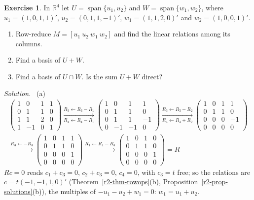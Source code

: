 \documentclass[12pt]{article}
\newcommand{\R}{\mathbb R}
\DeclareMathOperator{\Span}{span}
\theoremstyle{definition}
\newtheorem{exercise}{Exercise}
\newenvironment{solution}{\par\noindent\textit{Solution.}\ }{\par\smallskip}
\begin{document}
\begin{exercise}\label{r3-dr-sum-intersection}
In \(\R^4\) let \(U=\Span\{u_1,u_2\}\) and \(W=\Span\{w_1,w_2\}\), where \(u_1=(1,0,1,1)'\),
\(u_2=(0,1,1,-1)'\), \(w_1=(1,1,2,0)'\) and \(w_2=(1,0,0,1)'\).
\begin{enumerate}
\item Row-reduce \(M=[u_1\ u_2\ w_1\ w_2]\) and find the linear relations among its columns.
\item Find a basis of \(U+W\).
\item Find a basis of \(U\cap W\). Is the sum \(U+W\) direct?
\end{enumerate}
\end{exercise}
\begin{solution}
(a)
\[
\begin{gathered}
\begin{pmatrix}1&0&1&1\\0&1&1&0\\1&1&2&0\\1&-1&0&1\end{pmatrix}
\xrightarrow[R_4\leftarrow R_4-R_1]{R_3\leftarrow R_3-R_1}
\begin{pmatrix}1&0&1&1\\0&1&1&0\\0&1&1&-1\\0&-1&-1&0\end{pmatrix}
\xrightarrow[R_4\leftarrow R_4+R_2]{R_3\leftarrow R_3-R_2}
\begin{pmatrix}1&0&1&1\\0&1&1&0\\0&0&0&-1\\0&0&0&0\end{pmatrix}
\\
\xrightarrow{R_3\leftarrow-R_3}
\begin{pmatrix}1&0&1&1\\0&1&1&0\\0&0&0&1\\0&0&0&0\end{pmatrix}
\xrightarrow{R_1\leftarrow R_1-R_3}
\begin{pmatrix}1&0&1&0\\0&1&1&0\\0&0&0&1\\0&0&0&0\end{pmatrix}=R
\end{gathered}
\]
\(Rc=0\) reads \(c_1+c_3=0\), \(c_2+c_3=0\), \(c_4=0\), with \(c_3=t\) free; so the relations are
\(c=t(-1,-1,1,0)'\) (Theorem~\ref{r2-thm-rowops}(b), Proposition~\ref{r2-prop-solutions}(b)), the
multiples of \(-u_1-u_2+w_1=0\): \(w_1=u_1+u_2\).


\end{solution}
\end{document}
